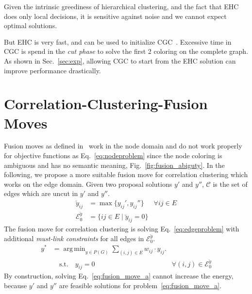 \documentclass[10pt,twocolumn,letterpaper]{article}
\DeclareMathOperator*{\argmin}{arg\,min}
\theoremstyle{definition}
\begin{document}
Given the intrinsic greediness of hierarchical clustering, 
and the fact that EHC does only local decisions, it is 
sensitive against noise and we cannot expect optimal solutions.

But EHC is very fast, and can be used to initialize
CGC~\cite{beier_2014_cvpr}. Excessive time in CGC
is spend in the \emph{cut phase} to solve the 
first 2 coloring on the complete graph.
As shown in Sec.~\ref{sec:exp},
allowing CGC to start from the EHC solution
can improve performance drastically.




\section{Correlation-Clustering-Fusion Moves}\label{sec:cc_fm}

Fusion moves as defined in~\cite{Lempitsky-2010} work
in the node domain and do not work properly for 
objective functions as Eq.~\ref{eq:nodeproblem} since
the node coloring is ambiguous and has no semantic meaning, \cf Fig.~\ref{fig:fusion_abiguty}.
In the following, we propose a more suitable fusion move for correlation
clustering which works on the edge domain.
%
Given two proposal solutions $y'$ and $y''$,
$\mathcal{C}$ is the set of edges
which are uncut in $y'$ and $y''$.
%
\begin{align}
\breve{y}_{ij}    & = \max\{ y_{ij}', y_{ij}''\}  & \forall {ij}\in E\\  %
\mathcal{E}_0^{\breve{y}}  & =  \{ ij \in E \; | \; \breve{y}_{ij} = 0 \}
\end{align}
%
The fusion move for correlation clustering is solving Eq.~\ref{eq:edgeproblem}
with additional \emph{must-link constraints} for all edges in $\mathcal{E}_0^{\breve{y}}$.
%
\begin{align}
  y^* &= \argmin_{y \in P(G)} \sum_{ (i,j) \in E } w_{ij} \cdot y_{ij} \label{eq:fusion_move_a}.\\ 
      &\quad \textrm{s.t.} \quad y_{ij} = 0 & \forall (i, j) \in \mathcal{E}_0^{\breve{y}} \nonumber
\end{align}
%
By construction, solving Eq.~\ref{eq:fusion_move_a} cannot increase the energy,
because $y'$ and $y''$ are feasible solutions for problem~\ref{eq:fusion_move_a}.
%
\end{document}
